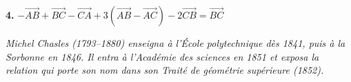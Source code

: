 \documentclass[12pt]{article}
\begin{document}
\textbf{4.} $-\overrightarrow{AB} + \overrightarrow{BC} - \overrightarrow{CA} + 3(\overrightarrow{AB} - \overrightarrow{AC}) - 2\overrightarrow{CB} = \overrightarrow{BC}$
\begin{tcolorbox}[case]\end{tcolorbox}

\vspace{0.4cm}
\textit{Michel Chasles (1793–1880) enseigna à l’École polytechnique dès 1841, puis à la Sorbonne en 1846. Il entra à l’Académie des sciences en 1851 et exposa la relation qui porte son nom dans son \textit{Traité de géométrie supérieure} (1852).}
\end{document}
